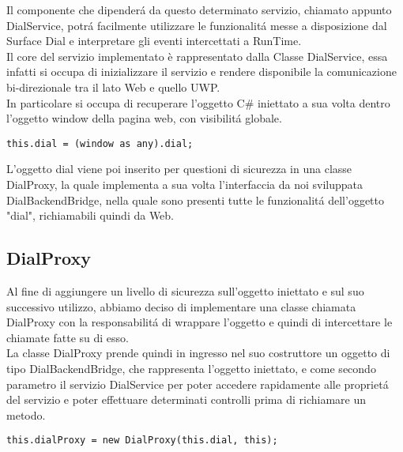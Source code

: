Il componente che dipenderá da questo determinato servizio, chiamato appunto DialService, potrá facilmente utilizzare le funzionalitá messe a disposizione dal Surface Dial e interpretare gli eventi intercettati a RunTime.\\

Il core del servizio implementato è rappresentato dalla Classe DialService, essa infatti si occupa di inizializzare il servizio e rendere disponibile la comunicazione bi-direzionale tra il lato Web e quello UWP.\\

In particolare si occupa di recuperare l'oggetto C\# iniettato a sua volta dentro l'oggetto window della pagina web, con visibilitá globale.\\

\vspace{1.0cm}
\begin{lstlisting}[caption={Recupero oggetto C\#},style=javaScriptCode]
	this.dial = (window as any).dial;
\end{lstlisting} 
\vspace{1.0cm}

L'oggetto dial viene poi inserito per questioni di sicurezza in una classe DialProxy, la quale implementa a sua volta l'interfaccia da noi sviluppata DialBackendBridge, nella quale sono presenti tutte le funzionalitá dell'oggetto "dial", richiamabili quindi da Web.

\subsection{DialProxy}

Al fine di aggiungere un livello di sicurezza sull’oggetto iniettato e sul suo successivo utilizzo, abbiamo deciso di implementare una classe chiamata DialProxy con la responsabilitá di wrappare l’oggetto e quindi di intercettare le chiamate fatte su di esso.\\

La classe DialProxy prende quindi in ingresso nel suo costruttore un oggetto di tipo DialBackendBridge, che rappresenta l'oggetto iniettato, e come secondo parametro il servizio DialService per poter accedere rapidamente alle proprietá del servizio e poter effettuare determinati controlli prima di richiamare un metodo.\\

\vspace{1.0cm}
\begin{lstlisting}[caption={Wrapping oggetto recuperato},style=javaScriptCode]
	this.dialProxy = new DialProxy(this.dial, this);
\end{lstlisting} 
\vspace{1.0cm}

